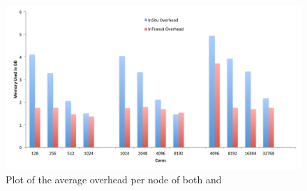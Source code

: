 \begin{figure}[htb]
  \centering
  \includegraphics[width=\linewidth]{figures/MemoryUsageCompare}
  \caption{Plot of the average overhead per node of both \insitu and \intransit}
  \label{fig:MemoryCompare}
\end{figure}


